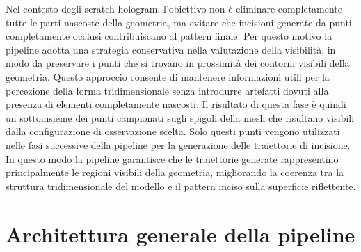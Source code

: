 \documentclass[a4paper,11pt,titlepage,twoside]{book}
\newcommand{\1}{\mathbf{1}}
\numberwithin{equation}{chapter}
\theoremstyle{plain}
\theoremstyle{definition}
\begin{document}
	Nel contesto degli scratch hologram, l’obiettivo non è eliminare completamente tutte le parti nascoste della geometria, ma evitare che incisioni generate da punti completamente occlusi contribuiscano al pattern finale. Per questo motivo la pipeline adotta una strategia conservativa nella valutazione della visibilità, in modo da preservare i punti che si trovano in prossimità dei contorni visibili della geometria. Questo approccio consente di mantenere informazioni utili per la percezione della forma tridimensionale senza introdurre artefatti dovuti alla presenza di elementi completamente nascosti.
	Il risultato di questa fase è quindi un sottoinsieme dei punti campionati sugli spigoli della mesh che risultano visibili dalla configurazione di osservazione scelta. Solo questi punti vengono utilizzati nelle fasi successive della pipeline per la generazione delle traiettorie di incisione.
	In questo modo la pipeline garantisce che le traiettorie generate rappresentino principalmente le regioni visibili della geometria, migliorando la coerenza tra la struttura tridimensionale del modello e il pattern inciso sulla superficie riflettente.
	
	\section{Architettura generale della pipeline}
	
\end{document}
